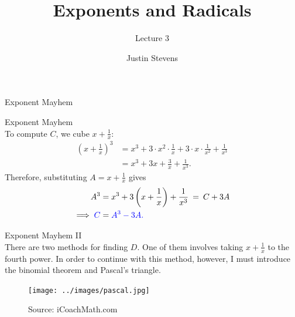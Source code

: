 \documentclass[xcolor=dvipsnames, fontsize=11pt, %
pagesize, %
parskip=half-, t]{beamer}
\title[Exponents and Radicals (Lecture 3)]{Exponents and Radicals}
\subtitle{Lecture 3}
\author[Justin Stevens (Star League)]{\large Justin Stevens} %
\date{}
\begin{document}
	\begin{frame}[c]
		\centering
		\titlepage
	\end{frame}



\begin{frame}[c]{Exponent Mayhem}
	\centering

\end{frame}


\begin{frame}{Exponent Mayhem}
	 ~\\
	
	To compute $C$, we cube $x+\frac{1}{x}$: \begin{align*} (x+\frac{1}{x})^3&=x^3+3\cdot x^2\cdot \frac{1}{x}+3\cdot x\cdot \frac{1}{x^2}+\frac{1}{x^3} \\ &= x^3+3x+\frac{3}{x}+\frac{1}{x^3}. \end{align*}
	Therefore, substituting $A=x+\frac{1}{x}$ gives \begin{align*} A^3&=x^3+3\left(x+\frac{1}{x}\right)+\frac{1}{x^3} \:=\:C+3A \\ \implies \color{blue} C &= \color{blue} A^3-3A. \end{align*}
\end{frame}

\begin{frame}{Exponent Mayhem II}
	 ~\\
	
	There are two methods for finding $D$. One of them involves taking $x+\frac{1}{x}$ to the fourth power. In order to continue with this method, however, I must introduce the binomial theorem and Pascal's triangle.  
	
	\begin{figure}[h]
		\centering\texttt{[image: ../images/pascal.jpg]}
		\caption{Source:  iCoachMath.com}
	\end{figure}
\end{frame}
\end{document}
